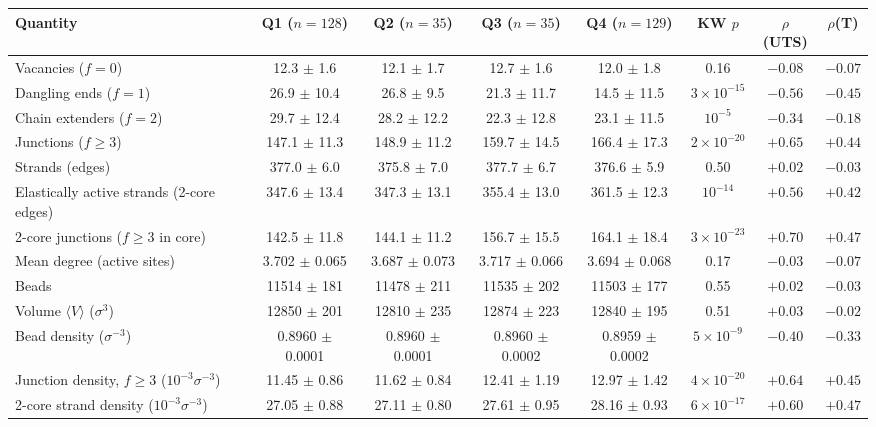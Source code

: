 \begin{tabular}{lccccccc}
\toprule
Quantity & Q1 ($n=128$) & Q2 ($n=35$) & Q3 ($n=35$) & Q4 ($n=129$) & KW $p$ & $\rho$(UTS) & $\rho$(T) \\
\midrule
Vacancies ($f=0$) & 12.3 $\pm$ 1.6 & 12.1 $\pm$ 1.7 & 12.7 $\pm$ 1.6 & 12.0 $\pm$ 1.8 & 0.16 & $-0.08$ & $-0.07$ \\
Dangling ends ($f=1$) & 26.9 $\pm$ 10.4 & 26.8 $\pm$ 9.5 & 21.3 $\pm$ 11.7 & 14.5 $\pm$ 11.5 & $3\times10^{-15}$ & $-0.56$ & $-0.45$ \\
Chain extenders ($f=2$) & 29.7 $\pm$ 12.4 & 28.2 $\pm$ 12.2 & 22.3 $\pm$ 12.8 & 23.1 $\pm$ 11.5 & $10^{-5}$ & $-0.34$ & $-0.18$ \\
Junctions ($f\geq3$) & 147.1 $\pm$ 11.3 & 148.9 $\pm$ 11.2 & 159.7 $\pm$ 14.5 & 166.4 $\pm$ 17.3 & $2\times10^{-20}$ & $+0.65$ & $+0.44$ \\
Strands (edges) & 377.0 $\pm$ 6.0 & 375.8 $\pm$ 7.0 & 377.7 $\pm$ 6.7 & 376.6 $\pm$ 5.9 & 0.50 & $+0.02$ & $-0.03$ \\
Elastically active strands (2-core edges) & 347.6 $\pm$ 13.4 & 347.3 $\pm$ 13.1 & 355.4 $\pm$ 13.0 & 361.5 $\pm$ 12.3 & $10^{-14}$ & $+0.56$ & $+0.42$ \\
2-core junctions ($f\geq3$ in core) & 142.5 $\pm$ 11.8 & 144.1 $\pm$ 11.2 & 156.7 $\pm$ 15.5 & 164.1 $\pm$ 18.4 & $3\times10^{-23}$ & $+0.70$ & $+0.47$ \\
Mean degree (active sites) & 3.702 $\pm$ 0.065 & 3.687 $\pm$ 0.073 & 3.717 $\pm$ 0.066 & 3.694 $\pm$ 0.068 & 0.17 & $-0.03$ & $-0.07$ \\
Beads & 11514 $\pm$ 181 & 11478 $\pm$ 211 & 11535 $\pm$ 202 & 11503 $\pm$ 177 & 0.55 & $+0.02$ & $-0.03$ \\
Volume $\langle V\rangle$ ($\sigma^3$) & 12850 $\pm$ 201 & 12810 $\pm$ 235 & 12874 $\pm$ 223 & 12840 $\pm$ 195 & 0.51 & $+0.03$ & $-0.02$ \\
Bead density ($\sigma^{-3}$) & 0.8960 $\pm$ 0.0001 & 0.8960 $\pm$ 0.0001 & 0.8960 $\pm$ 0.0002 & 0.8959 $\pm$ 0.0002 & $5\times10^{-9}$ & $-0.40$ & $-0.33$ \\
Junction density, $f\geq3$ ($10^{-3}\sigma^{-3}$) & 11.45 $\pm$ 0.86 & 11.62 $\pm$ 0.84 & 12.41 $\pm$ 1.19 & 12.97 $\pm$ 1.42 & $4\times10^{-20}$ & $+0.64$ & $+0.45$ \\
2-core strand density ($10^{-3}\sigma^{-3}$) & 27.05 $\pm$ 0.88 & 27.11 $\pm$ 0.80 & 27.61 $\pm$ 0.95 & 28.16 $\pm$ 0.93 & $6\times10^{-17}$ & $+0.60$ & $+0.47$ \\
\bottomrule
\end{tabular}
